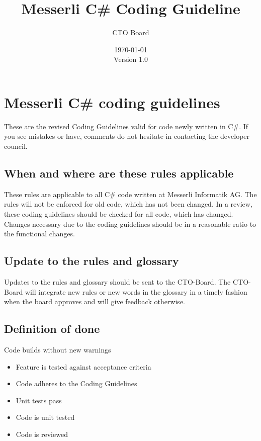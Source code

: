 \documentclass[11pt,a4paper]{article}
\begin{document}
\title{Messerli C\# Coding Guideline}
\author{CTO Board}
\date{\today\\Version 1.0}
\maketitle

\inlinetoc

\newpage

\section{Messerli C\# coding guidelines}

These are the revised Coding Guidelines valid for code newly written in C\#.
If you see mistakes or have, comments do not hesitate in contacting the developer council.

\subsection{When and where are these rules applicable}

These rules are applicable to all C\# code written at Messerli Informatik AG. 
The rules will not be enforced for old code, which has not been changed.
In a review, these coding guidelines should be checked for all code, which has changed.
Changes necessary due to the coding guidelines should be in a reasonable ratio to the functional changes.

\subsection{Update to the rules and glossary}

Updates to the rules and glossary should be sent to the CTO-Board. The CTO-Board will integrate new rules or new words in the glossary in a timely fashion when the board approves and will give feedback otherwise.

\subsection{Definition of done}

Code builds without new warnings

\begin{itemize}[itemsep=0pt]
  \item Feature is tested against acceptance criteria
  \item Code adheres to the Coding Guidelines
  \item Unit tests pass
  \item Code is unit tested
  \item Code is reviewed
\end{itemize}
\end{document}
